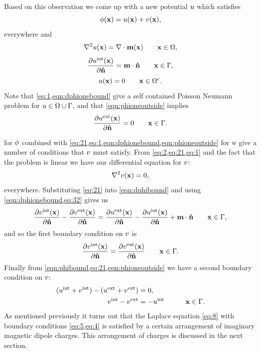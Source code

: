 Based on this observation we come up with a new potential $u$ which satisfies
\begin{equation}
  \phi(\boldsymbol{\mathrm{x}}) = u(\boldsymbol{\mathrm{x}}) + v(\boldsymbol{\mathrm{x}}),
  \label{eq:21}
\end{equation}
everywhere and
\begin{equation}
  \nabla^2 u(\boldsymbol{\mathrm{x}}) = \nabla \cdot \boldsymbol{\mathrm{m}}(\boldsymbol{\mathrm{x}}) \qquad \boldsymbol{\mathrm{x}} \in \Omega,
  \label{eq:1}
\end{equation}
\begin{equation}
  \frac{\partial u^{\mathrm{int}}(\boldsymbol{\mathrm{x}})}{\partial \boldsymbol{\mathrm{\hat{n}}}} = \boldsymbol{\mathrm{m}} \cdot \boldsymbol{\mathrm{\hat{n}}} \qquad \boldsymbol{\mathrm{x}} \in {\Gamma},
  \label{eqn:dphionebound}
\end{equation}
\begin{equation}
  u(\boldsymbol{\mathrm{x}}) = 0 \qquad \boldsymbol{\mathrm{x}} \in {\Omega^c}.
  \label{eqn:phioneoutside}
\end{equation}
Note that \cref{eq:1,eqn:dphionebound} give a self contained Poisson Neumann problem for $u \in \Omega \cup {\Gamma}$, and that \cref {eqn:phioneoutside} implies
\begin{equation}
  \frac{\partial u^{\mathrm{ext}}(\boldsymbol{\mathrm{x}})}{\partial \boldsymbol{\mathrm{\hat{n}}}} = 0 \qquad \boldsymbol{\mathrm{x}} \in {\Gamma}.
  \label{eq:32}
\end{equation}


 for $\phi$ combined with \cref{eq:21,eq:1,eqn:dphionebound,eqn:phioneoutside} for $u$ give a number of conditions that $v$ must satisfy.
From \cref{eq:2,eq:21,eq:1} and the fact that the problem is linear we have our differential equation for $v$:
\begin{equation}
  \label{eq:8}
  \nabla^2 v(\boldsymbol{\mathrm{x}}) = 0,
\end{equation}
everywhere.
Substituting \cref{eq:21} into \cref{eqn:dphibound} and using \cref{eqn:dphionebound,eq:32} gives us
\begin{equation}
    \frac{\partial v^{\mathrm{int}}(\boldsymbol{\mathrm{x}})}{\partial \boldsymbol{\mathrm{\hat{n}}}} - \frac{\partial v^{\mathrm{ext}}(\boldsymbol{\mathrm{x}})}{\partial \boldsymbol{\mathrm{\hat{n}}}} =
    \frac{\partial u^{\mathrm{ext}}(\boldsymbol{\mathrm{x}})}{\partial \boldsymbol{\mathrm{\hat{n}}}} - \frac{\partial u^{\mathrm{int}}(\boldsymbol{\mathrm{x}})}{\partial \boldsymbol{\mathrm{\hat{n}}}}
    + \boldsymbol{\mathrm{m}} \cdot \boldsymbol{\mathrm{\hat{n}}} \qquad \boldsymbol{\mathrm{x}} \in {\Gamma},
\end{equation}
and so the first boundary condition on $v$ is
\begin{equation}
  \frac{\partial v^{\mathrm{int}}(\boldsymbol{\mathrm{x}})}{\partial \boldsymbol{\mathrm{\hat{n}}}} = \frac{\partial v^{\mathrm{ext}}(\boldsymbol{\mathrm{x}})}{\partial \boldsymbol{\mathrm{\hat{n}}}}  \qquad \boldsymbol{\mathrm{x}} \in {\Gamma}.
  \label{eq:5}
\end{equation}
Finally from \cref{eqn:phibound,eq:21,eqn:phioneoutside} we have a second boundary condition on $v$:
\begin{equation}
  \begin{aligned}
    (u^{\mathrm{int}} + v^{\mathrm{int}}) - (u^{\mathrm{ext}} + v^{\mathrm{ext}}) &= 0, \\
    v^{\mathrm{int}} - v^{\mathrm{ext}} &= - u^{\mathrm{int}} &\qquad \boldsymbol{\mathrm{x}} \in {\Gamma}.
    \label{eq:4}
  \end{aligned}
\end{equation}
As mentioned previously it turns out that the Laplace equation \cref{eq:8} with boundary conditions \cref{eq:5,eq:4} is satisfied by a certain arrangement of imaginary magnetic dipole charges.
This arrangement of charges is discussed in the next section.

